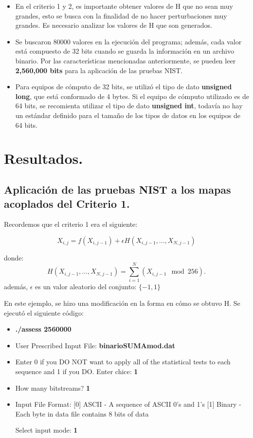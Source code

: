 \documentclass[12pt,3p]{elsarticle}
\begin{document}
\begin{itemize}

\item En el criterio 1 y 2, es importante obtener valores de H que no sean muy grandes, esto se busca con la finalidad de no hacer perturbaciones muy grandes. Es necesario analizar los valores de H que son generados. 

\item Se buscaron 80000 valores en la ejecución del programa; además, cada valor está compuesto de 32 bits cuando se guarda la información en un archivo binario. Por las características mencionadas anteriormente, se pueden leer \textbf{2,560,000 bits} para la aplicación de las pruebas NIST.

\item Para equipos de cómputo de 32 bits, se utilizó el tipo de dato \textbf{unsigned long}, que está conformado de 4 bytes. Si el equipo de cómputo utilizado es de 64 bits, se recomienta utilizar el tipo de dato \textbf{unsigned int}, todavía no hay un estándar definido para el tamaño de los tipos de datos en los equipos de 64 bits.
\end{itemize}


\section{Resultados.}

\subsection{Aplicación de las pruebas NIST a los mapas acoplados del Criterio 1.}
Recordemos que el criterio 1 era el siguiente:

\begin{equation}
X_{i,j}= f(X_{i,j-1})+ \epsilon  H(X_{i,j-1},...,X_{N,j-1})
\end{equation}

donde:
\begin{equation}
H(X_{i,j-1},...,X_{N,j-1}) = \sum_{i=1}^{N}(X_{i,j-1}\mod 256).
\end{equation}
además, $\epsilon$ es un valor aleatorio del conjunto: ${\{-1,  1 \}}$


En este ejemplo, se hizo una modificación en la forma en cómo se obtuvo H. Se ejecutó el siguiente código:

\begin{itemize}
\item \textbf{./assess 2560000}
\item User Prescribed Input File: \textbf{binarioSUMAmod.dat}
\item    Enter 0 if you DO NOT want to apply all of the
         statistical tests to each sequence and 1 if you DO. Enter chice: \textbf{1}
                  
\item  How many bitstreams? \textbf{1}

\item Input File Format:
    [0] ASCII - A sequence of ASCII 0's and 1's
    [1] Binary - Each byte in data file contains 8 bits of data

   Select input mode:  \textbf{1}
\end{itemize}
\end{document}
